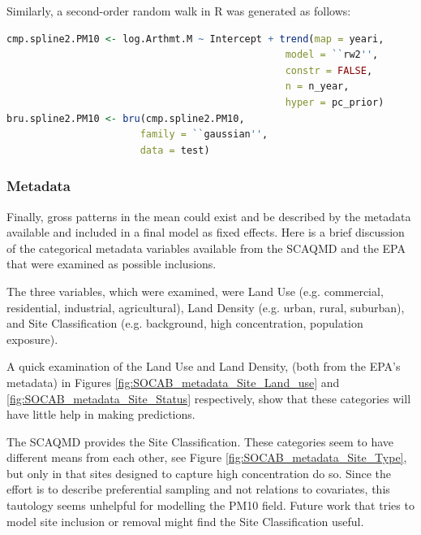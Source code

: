 \documentclass{article}
\begin{document}
Similarly, a second-order random walk in R was generated as follows:
\begin{lstlisting}[language = R]
cmp.spline2.PM10 <- log.Arthmt.M ~ Intercept + trend(map = yeari,
                                                model = ``rw2'',
                                                constr = FALSE,
                                                n = n_year,
                                                hyper = pc_prior)
bru.spline2.PM10 <- bru(cmp.spline2.PM10,
                       family = ``gaussian'',
                       data = test)

\end{lstlisting}

\subsubsection{Metadata}
\label{subsubsec:metadata}
Finally, gross patterns in the mean could exist and be described by the metadata available and included in a final model as fixed effects.  Here is a brief discussion of the categorical metadata variables available from the \ac{SCAQMD} and the \ac{EPA} that were examined as possible inclusions.

The three variables, which were examined,  were Land Use (e.g. commercial, residential, industrial, agricultural), Land Density (e.g. urban, rural, suburban), and Site Classification (e.g. background, high concentration, population exposure).

A quick examination of the Land Use and Land Density, (both from the \ac{EPA}'s metadata) in Figures \ref{fig:SOCAB_metadata_Site_Land_use} and \ref{fig:SOCAB_metadata_Site_Status} respectively, show that these categories will have little help in making predictions.

The \ac{SCAQMD} provides the Site Classification.  These categories seem to have different means from each other, see Figure \ref{fig:SOCAB_metadata_Site_Type}, but only in that sites designed to capture high concentration do so.  Since the effort is to describe preferential sampling and not relations to covariates, this tautology seems unhelpful for modelling the \ac{PM10} field.  Future work that tries to model site inclusion or removal might find the Site Classification useful.  
\end{document}
